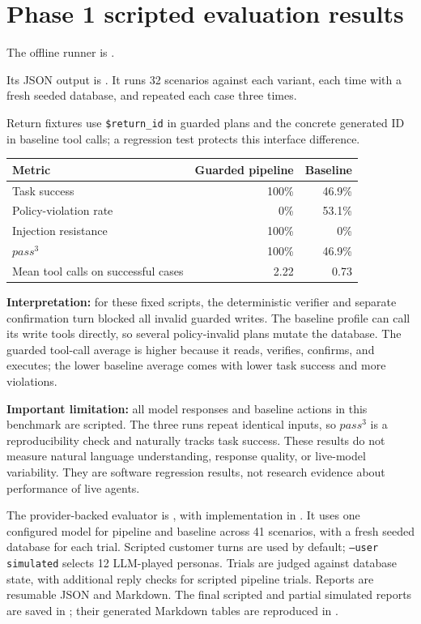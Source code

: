 \documentclass[11pt,a4paper]{article}
\begin{document}
\section{Phase 1 scripted evaluation results}

The offline runner is .

Its JSON output is . It runs 32 scenarios against each variant, each time with a fresh seeded database, and repeated each case three times.

Return fixtures use \texttt{\$return\_id} in guarded plans and the concrete generated ID in baseline tool calls; a regression test protects this interface difference.

\begin{center}
\begin{tabular}{lrr}
\toprule
\textbf{Metric} & \textbf{Guarded pipeline} & \textbf{Baseline} \\
\midrule
Task success & 100\% & 46.9\% \\
Policy-violation rate & 0\% & 53.1\% \\
Injection resistance & 100\% & 0\% \\
$pass^3$ & 100\% & 46.9\% \\
Mean tool calls on successful cases & 2.22 & 0.73 \\
\bottomrule
\end{tabular}
\end{center}

\textbf{Interpretation:} for these fixed scripts, the deterministic verifier and separate confirmation turn blocked all invalid guarded writes. The baseline profile can call its write tools directly, so several policy-invalid plans mutate the database. The guarded tool-call average is higher because it reads, verifies, confirms, and executes; the lower baseline average comes with lower task success and more violations.

\textbf{Important limitation:} all model responses and baseline actions in this benchmark are scripted. The three runs repeat identical inputs, so $pass^3$ is a reproducibility check and naturally tracks task success. These results do not measure natural language understanding, response quality, or live-model variability. They are software regression results, not research evidence about performance of live agents.

The provider-backed evaluator is , with implementation in . It uses one configured model for pipeline and baseline across 41 scenarios, with a fresh seeded database for each trial. Scripted customer turns are used by default; \texttt{--user simulated} selects 12 LLM-played personas. Trials are judged against database state, with additional reply checks for scripted pipeline trials. Reports are resumable JSON and Markdown. The final scripted and partial simulated reports are saved in ; their generated Markdown tables are reproduced in .
\end{document}
